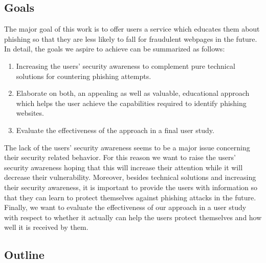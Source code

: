 \subsection{Goals}
\label{s:goals}
The major goal of this work is to offer users a service which educates them about phishing so that they are less likely to fall for fraudulent webpages in the future.
In detail, the goals we aspire to achieve can be summarized as follows:

\begin{enumerate}
	\item Increasing the users' security awareness to complement pure technical solutions for countering phishing attempts.
	\item Elaborate on both, an appealing as well as valuable, educational approach which helps the user achieve the capabilities required to identify phishing websites.
	\item Evaluate the effectiveness of the approach in a final user study.
\end{enumerate}
The lack of the users' security awareness seems to be a major issue concerning their security related behavior.
 For this reason we want to raise the users' security awareness hoping that this will increase their attention while it will decrease their vulnerability.
 Moreover, besides technical solutions and increasing their security awareness, it is important to provide the users with information so that they can learn to protect themselves against phishing attacks in the future.
Finally, we want to evaluate the effectiveness of our approach in a user study with respect to whether it actually can help the users protect themselves and how well it is received by them.

\subsection{Outline}


